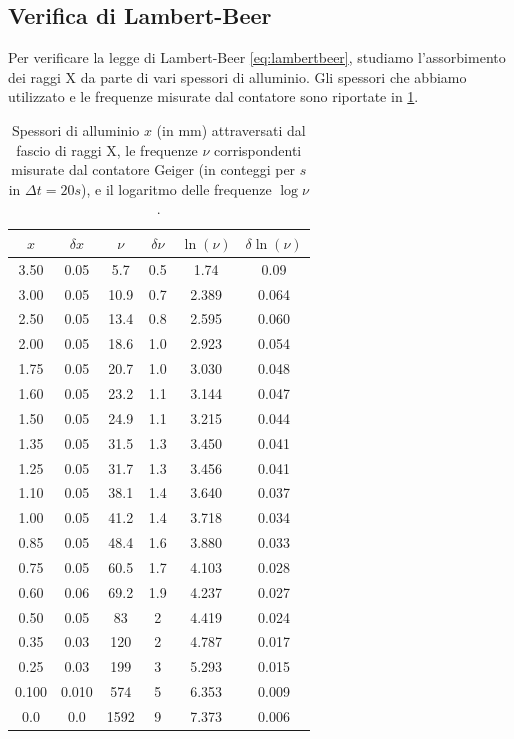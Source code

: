 
\subsection{Verifica di Lambert-Beer}

Per verificare la legge di Lambert-Beer \cref{eq:lambertbeer}, studiamo l'assorbimento dei raggi X da parte di vari spessori di alluminio.
Gli spessori che abbiamo utilizzato e le frequenze misurate dal contatore sono riportate in \cref{tab:lambert}.

\begin{table}[]
  \centering
  \footnotesize
  \begin{tabular}{cc|cc|cc}
$x$ & $\delta x$ & $\nu$ & $\delta \nu$ & $\ln(\nu)$ & $\delta \ln(\nu)$ \\
\hline
3.50 & 0.05 & 5.7 & 0.5 & 1.74 & 0.09 \\
3.00 & 0.05 & 10.9 & 0.7 & 2.389 & 0.064 \\
2.50 & 0.05 & 13.4 & 0.8 & 2.595 & 0.060 \\
2.00 & 0.05 & 18.6 & 1.0 & 2.923 & 0.054 \\
1.75 & 0.05 & 20.7 & 1.0 & 3.030 & 0.048 \\
1.60 & 0.05 & 23.2 & 1.1 & 3.144 & 0.047 \\
1.50 & 0.05 & 24.9 & 1.1 & 3.215 & 0.044 \\
1.35 & 0.05 & 31.5 & 1.3 & 3.450 & 0.041 \\
1.25 & 0.05 & 31.7 & 1.3 & 3.456 & 0.041 \\
1.10 & 0.05 & 38.1 & 1.4 & 3.640 & 0.037 \\
1.00 & 0.05 & 41.2 & 1.4 & 3.718 & 0.034 \\
0.85 & 0.05 & 48.4 & 1.6 & 3.880 & 0.033 \\
0.75 & 0.05 & 60.5 & 1.7 & 4.103 & 0.028 \\
0.60 & 0.06 & 69.2 & 1.9 & 4.237 & 0.027 \\
0.50 & 0.05 & 83 & 2 & 4.419 & 0.024 \\
0.35 & 0.03 & 120 & 2 & 4.787 & 0.017 \\
0.25 & 0.03 & 199 & 3 & 5.293 & 0.015 \\
0.100 & 0.010 & 574 & 5 & 6.353 & 0.009 \\
0.0 & 0.0 & 1592 & 9 & 7.373 & 0.006 \\
\end{tabular}
  \caption{Spessori di alluminio $ x $ (in \unit{mm}) attraversati dal fascio di raggi X, le frequenze $ \nu $ corrispondenti misurate dal contatore Geiger (in conteggi per $ \unit{s} $ in $ \Delta t = 20 \unit{s} $), e il logaritmo delle frequenze $ \log \nu $.}
  \label{tab:lambert}
\end{table}

